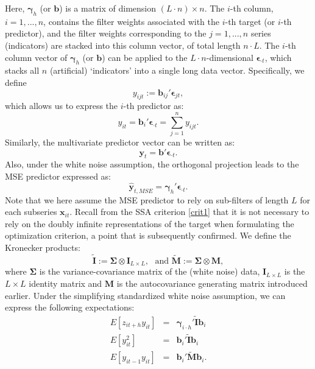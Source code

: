 \documentclass[11pt,a4paper]{article}
\begin{document}
Here, $\boldsymbol{\gamma}_{h}$ (or $\mathbf{b}$) is a matrix of dimension $(L\cdot n)\times n$. The $i$-th column, $i=1,...,n$, contains the filter weights associated with the $i$-th target (or $i$-th predictor), and the filter weights corresponding to the $j=1,...,n$ series (indicators) are stacked into this column vector, of total length $n\cdot L$. The $i$-th column vector of $\boldsymbol{\gamma}_{h}$ (or $\mathbf{b}$) can be applied to the $L\cdot n$-dimensional $\boldsymbol{\epsilon}_{\cdot t}$, which stacks all $n$ (artificial) `indicators' into a single long data vector. Specifically, we define 
\[
y_{ijt} := \mathbf{b}_{ij}'\boldsymbol{\epsilon}_{jt},
\]
which allows us to express the $i$-th predictor as:
\[
y_{it} = \mathbf{b}_i'\boldsymbol{\epsilon}_{\cdot t} = \sum_{j=1}^n y_{ijt}.
\] 
Similarly, the multivariate predictor vector can be written as:
\[
\mathbf{y}_t = \mathbf{b}'\boldsymbol{\epsilon}_{\cdot t}.
\]
Also, under the white noise assumption, the orthogonal projection leads to the MSE predictor expressed as:
\[
\hat{\mathbf{y}}_{t,MSE} = \boldsymbol{\gamma}_{h}'\boldsymbol{\epsilon}_{\cdot t}.
\]
Note that we here assume the MSE predictor to rely on sub-filters of length $L$ for  each subseries $\mathbf{x}_{it}$.  
Recall from the SSA criterion \eqref{crit1}  that it is not necessary to rely on the doubly infinite representations of the target when formulating the optimization criterion, a point that is subsequently confirmed. 
We define the Kronecker products: 
\[
\tilde{\mathbf{I}}:=\boldsymbol{\Sigma}\otimes\mathbf{I}_{L\times L},\textrm{ ~and~} \tilde{\mathbf{M}}:=\boldsymbol{\Sigma}\otimes\mathbf{M},
\]
where $\boldsymbol{\Sigma}$ is the variance-covariance matrix of the (white noise) data,  $\mathbf{I}_{L\times L}$ is the  $L\times L$ identity matrix  and  $\mathbf{M}$ is the autocovariance generating matrix introduced earlier. Under the simplifying standardized white noise assumption, we can express the following expectations: 
\begin{eqnarray}
E[z_{it+h}y_{it}]&=&\boldsymbol{\gamma}_{i\cdot h}'\tilde{\mathbf{I}}\mathbf{b}_{i}\nonumber\\%
E[y_{it}^2]&=&\mathbf{b}_{i}'\tilde{\mathbf{I}}\mathbf{b}_{i}\nonumber\\%
E[y_{it-1}y_{it}]&=&\mathbf{b}_{i}'\tilde{\mathbf{M}}\mathbf{b}_{i}.\nonumber
\end{eqnarray}
\end{document}
